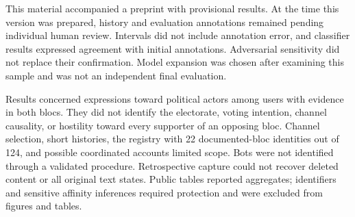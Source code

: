 \documentclass[11pt,a4paper]{article}
\begin{document}
This material accompanied a preprint with provisional results. At the time this version was prepared, history and evaluation annotations remained pending individual human review. Intervals did not include annotation error, and classifier results expressed agreement with initial annotations. Adversarial sensitivity did not replace their confirmation. Model expansion was chosen after examining this sample and was not an independent final evaluation.

Results concerned expressions toward political actors among users with evidence in both blocs. They did not identify the electorate, voting intention, channel causality, or hostility toward every supporter of an opposing bloc. Channel selection, short histories, the registry with 22 documented-bloc identities out of 124, and possible coordinated accounts limited scope. Bots were not identified through a validated procedure. Retrospective capture could not recover deleted content or all original text states. Public tables reported aggregates; identifiers and sensitive affinity inferences required protection and were excluded from figures and tables.


\end{document}
